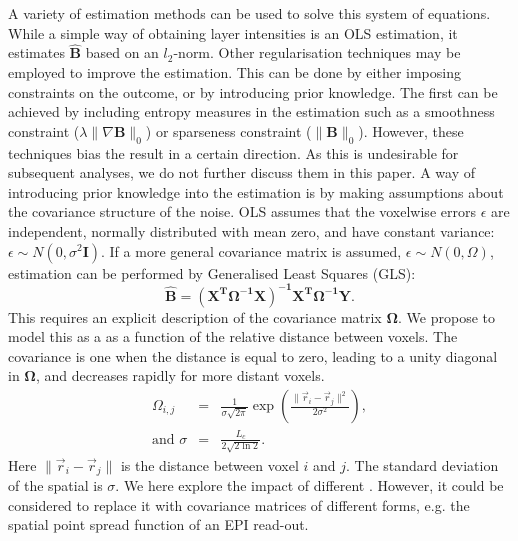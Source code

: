 A variety of estimation methods can be used to solve this system of equations. While a simple way of obtaining layer intensities is an OLS estimation, it estimates $\hat{\mathbf{B}}$ based on an $l_2$-norm. Other regularisation techniques may be employed to improve the estimation. This can be done by either imposing constraints on the outcome, or by introducing prior knowledge. The first can be achieved by including entropy measures in the estimation such as a smoothness constraint ($\lambda \| \nabla \mathbf{B} \|_0$) or sparseness constraint ($\| \mathbf{B} \|_0$). However, these techniques bias the result in a certain direction. As this is undesirable for subsequent analyses, we do not further discuss them in this paper. A way of introducing prior knowledge into the estimation is by making assumptions about the covariance structure of the noise. OLS assumes that the voxelwise errors $\epsilon$ are independent, normally distributed with mean zero, and have constant variance: $\epsilon \sim  N(0,\sigma^2 \mathbf{I})$. If a more general covariance matrix is assumed, $\epsilon \sim  N(0,\Omega)$, estimation can be performed by Generalised Least Squares (GLS): 
\begin{equation}
\mathbf{\hat{B}=\left(X^T \Omega^{-1}X\right)^{-1} X^T\Omega^{-1} Y}.
\end{equation}
This requires an explicit description of the covariance matrix $\mathbf{\Omega}$. We propose to model this as a  as a function of the relative distance between voxels. The covariance is one when the distance is equal to zero, leading to a unity diagonal in  $\mathbf{\Omega}$, and decreases rapidly for more distant voxels. 
\begin{eqnarray}
\Omega_{i,j}&=&
\frac{1}{\sigma\sqrt{2\pi}}
\exp\left(\frac{\|\vec{r}_i-\vec{r}_j\|^2}{2\sigma^2}\right),\nonumber \\
\text{and}\,\, \sigma&=&\frac{L_c}{2\sqrt{2\ln{2}}}.
\end{eqnarray}
Here $\| \vec{r}_i - \vec{r}_j\|$ is the distance between voxel $i$ and $j$. The standard deviation of the spatial  is $\sigma$. We here explore the impact of different . However, it could be considered to replace it with covariance matrices of different forms, e.g. the spatial point spread function of an EPI read-out. 
  
